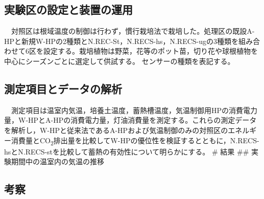 \documentclass[
  japanese,
  11pt,
  letterpaper,
  DIV=11,
  numbers=noendperiod]{scrartcl}
\begin{document}
\begin{table}

\caption{\label{tbl-spec}熱源の諸元}


\end{table}%

\subsection{実験区の設定と装置の運用}\label{ux5b9fux9a13ux533aux306eux8a2dux5b9aux3068ux88c5ux7f6eux306eux904bux7528}

　対照区は根域温度の制御は行わず，慣行栽培法で栽培した。処理区の既設A-HPと新規W-HPの2種類とN.REC-St，N.RECS-hs，N.RECS-ugの3種類を組み合わせて6区を設定する。栽培植物は野菜，花等のポット苗，切り花や球根植物を中心にシーズンごとに選定して供試する。
センサーの種類を表記する。

\subsection{測定項目とデータの解析}\label{ux6e2cux5b9aux9805ux76eeux3068ux30c7ux30fcux30bfux306eux89e3ux6790}

　測定項目は温室内気温，培養土温度，蓄熱槽温度，気温制御用HPの消費電力量，W-HPとA-HPの消費電力量，灯油消費量を測定する。これらの測定データを解析し，W-HPと従来法であるA-HPおよび気温制御のみの対照区のエネルギー消費量とCO\textsubscript{2}排出量を比較してW-HPの優位性を検証するとともに，N.RECS-hsとN.RECS-stを比較して蓄熱の有効性について明らかにする。
\# 結果 \#\# 実験期間中の温室内の気温の推移

\subsection{考察}\label{ux8003ux5bdf}
\end{document}
